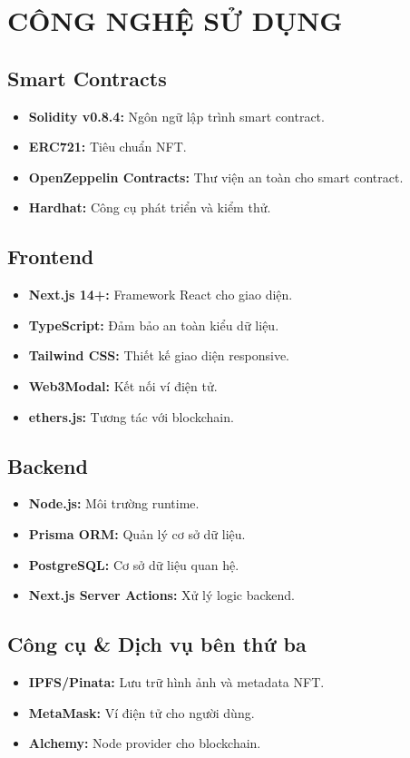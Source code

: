 \chapter{CÔNG NGHỆ SỬ DỤNG}

\section{Smart Contracts}
\begin{itemize}
    \item \textbf{Solidity v0.8.4:} Ngôn ngữ lập trình smart contract.
    \item \textbf{ERC721:} Tiêu chuẩn NFT.
    \item \textbf{OpenZeppelin Contracts:} Thư viện an toàn cho smart contract.
    \item \textbf{Hardhat:} Công cụ phát triển và kiểm thử.
\end{itemize}

\section{Frontend}
\begin{itemize}
    \item \textbf{Next.js 14+:} Framework React cho giao diện.
    \item \textbf{TypeScript:} Đảm bảo an toàn kiểu dữ liệu.
    \item \textbf{Tailwind CSS:} Thiết kế giao diện responsive.
    \item \textbf{Web3Modal:} Kết nối ví điện tử.
    \item \textbf{ethers.js:} Tương tác với blockchain.
\end{itemize}

\section{Backend}
\begin{itemize}
    \item \textbf{Node.js:} Môi trường runtime.
    \item \textbf{Prisma ORM:} Quản lý cơ sở dữ liệu.
    \item \textbf{PostgreSQL:} Cơ sở dữ liệu quan hệ.
    \item \textbf{Next.js Server Actions:} Xử lý logic backend.
\end{itemize}

\section{Công cụ \& Dịch vụ bên thứ ba}
\begin{itemize}
    \item \textbf{IPFS/Pinata:} Lưu trữ hình ảnh và metadata NFT.
    \item \textbf{MetaMask:} Ví điện tử cho người dùng.
    \item \textbf{Alchemy:} Node provider cho blockchain.
\end{itemize} 